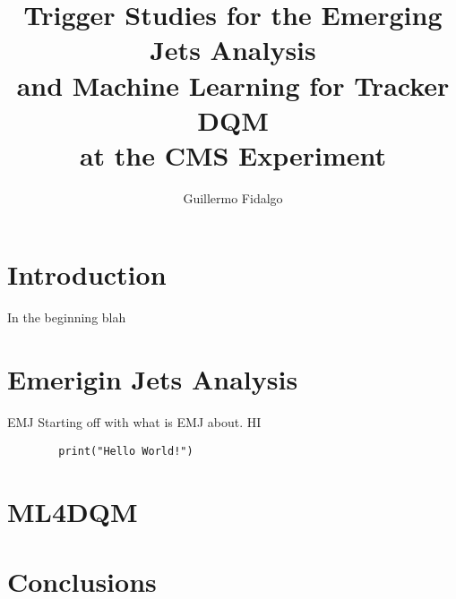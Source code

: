 \documentclass{beamer}
\title[EMJ and ML4TkDQM]{Trigger Studies for the Emerging Jets Analysis \\and Machine Learning for Tracker DQM \\at the CMS Experiment}
\author[GAFR]{Guillermo Fidalgo}
\institute[UPRM]{University of Puerto Rico - Mayagüez}
\begin{document}
\maketitle

\begin{frame}
	\tableofcontents
\end{frame}

\section{Introduction}
\begin{frame}{In the beginning}
	blah
\end{frame}

\section{Emerigin Jets Analysis}

\begin{frame}[fragile]{EMJ}
	Starting off with what is EMJ about.
	HI
	\begin{verbatim}
        print("Hello World!")
    \end{verbatim}
\end{frame}

\section{ML4DQM}


\section{Conclusions}
\end{document}
